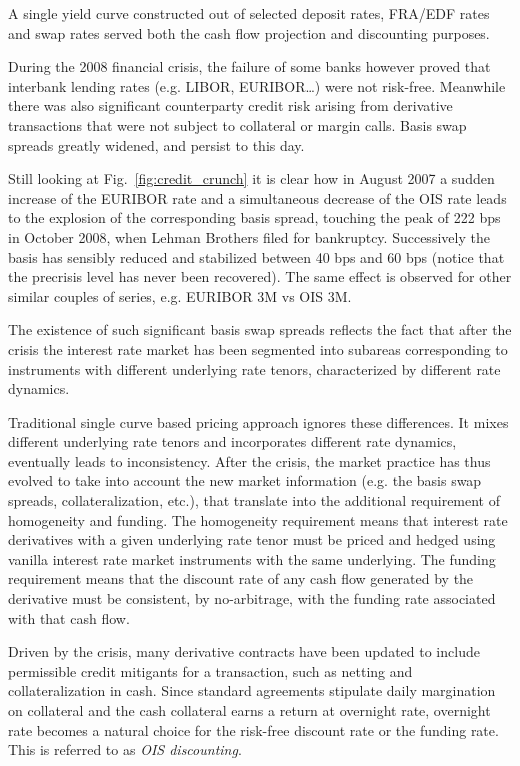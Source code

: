 A single yield curve constructed out of selected deposit rates, FRA/EDF rates and swap rates served both the cash flow projection and discounting purposes.

During the 2008 financial crisis, the failure of some banks however proved that interbank lending rates (e.g. LIBOR, EURIBOR\ldots) were not risk-free. Meanwhile there was also significant counterparty credit risk arising from derivative transactions that were not subject to collateral or margin calls. Basis swap spreads greatly widened, and persist to this day. 

Still looking at Fig.~\ref{fig:credit_crunch} it is clear how in August 2007 a sudden increase of the EURIBOR rate and a simultaneous decrease of the OIS rate leads to the explosion of the corresponding basis spread, touching the peak of 222 bps in October 2008, when Lehman Brothers filed for bankruptcy. Successively the basis has sensibly reduced and stabilized between 40 bps and 60 bps (notice that the precrisis level has never been recovered). The same effect is observed for other similar couples of series, e.g. EURIBOR 3M vs OIS 3M.

The existence of such significant basis swap spreads reflects the fact that after the crisis the interest rate market has been segmented into subareas corresponding to instruments with different underlying rate tenors, characterized by different rate dynamics. 

Traditional single curve based pricing approach ignores these differences. It mixes different underlying rate tenors and incorporates different rate dynamics, eventually leads to inconsistency.
After the crisis, the market practice has thus evolved to take into account the new market information (e.g. the basis swap spreads, collateralization, etc.), that translate into the additional requirement of homogeneity and funding. The homogeneity requirement means that interest rate derivatives with a given underlying rate tenor must be priced and hedged using vanilla interest rate market instruments with the same underlying. The funding requirement means that the discount rate of any cash flow generated by the derivative must be consistent, by no-arbitrage, with the funding rate associated with that cash flow. 

Driven by the crisis, many derivative contracts have been updated to include permissible credit mitigants for a transaction, such as netting and collateralization in cash. Since standard agreements stipulate daily margination on collateral and the cash collateral earns a return at overnight rate, overnight rate becomes a natural choice for the risk-free discount rate or the funding rate. This is referred to as \emph{OIS discounting}.

